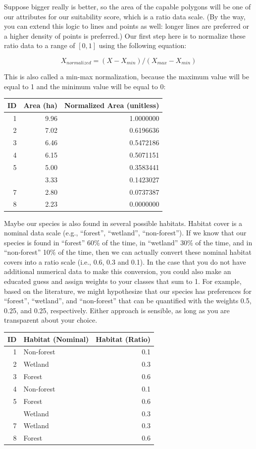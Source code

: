 \documentclass[
]{book}
\begin{document}
Suppose bigger really is better, so the area of the capable polygons will be one of our attributes for our suitability score, which is a ratio data scale. (By the way, you can extend this logic to lines and points as well: longer lines are preferred or a higher density of points is preferred.) Our first step here is to normalize these ratio data to a range of \([0,1]\) using the following equation:

\[
X_{normalized} = (X-X_{min})/(X_{max}-X_{min})
\]

This is also called a min-max normalization, because the maximum value will be equal to 1 and the minimum value will be equal to 0:

\begin{tabular}{rrr}
\toprule
ID & Area (ha) & Normalized Area (unitless)\\
\midrule
1 & 9.96 & 1.0000000\\
2 & 7.02 & 0.6196636\\
3 & 6.46 & 0.5472186\\
4 & 6.15 & 0.5071151\\
5 & 5.00 & 0.3583441\\
\addlinespace
6 & 3.33 & 0.1423027\\
7 & 2.80 & 0.0737387\\
8 & 2.23 & 0.0000000\\
\bottomrule
\end{tabular}

Maybe our species is also found in several possible habitats. Habitat cover is a nominal data scale (e.g., ``forest'', ``wetland'', ``non-forest''). If we know that our species is found in ``forest'' 60\% of the time, in ``wetland'' 30\% of the time, and in ``non-forest'' 10\% of the time, then we can actually convert these nominal habitat covers into a ratio scale (i.e., 0.6, 0.3 and 0.1). In the case that you do not have additional numerical data to make this conversion, you could also make an educated guess and assign weights to your classes that sum to 1. For example, based on the literature, we might hypothesize that our species has preferences for ``forest'', ``wetland'', and ``non-forest'' that can be quantified with the weights 0.5, 0.25, and 0.25, respectively. Either approach is sensible, as long as you are transparent about your choice.

\begin{tabular}{rlr}
\toprule
ID & Habitat (Nominal) & Habitat (Ratio)\\
\midrule
1 & Non-forest & 0.1\\
2 & Wetland & 0.3\\
3 & Forest & 0.6\\
4 & Non-forest & 0.1\\
5 & Forest & 0.6\\
\addlinespace
6 & Wetland & 0.3\\
7 & Wetland & 0.3\\
8 & Forest & 0.6\\
\bottomrule
\end{tabular}
\end{document}
